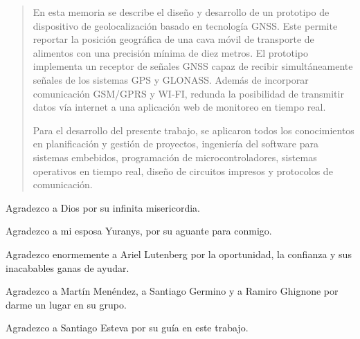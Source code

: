\documentclass[
11pt, %
spanish,
singlespacing, %
parskip, %
headsepline, %
]{MastersDoctoralThesis} %
\author{Ing. Luis David Díaz Charris} %
\begin{document}
\frontmatter %

\pagestyle{plain} %



\begin{abstract}
\addchaptertocentry{\abstractname} %
%
\centering

En esta memoria se describe el diseño y desarrollo de un prototipo de dispositivo de geolocalización basado en tecnología GNSS. Este permite reportar la posición geográfica de una cava móvil de transporte de alimentos con una precisión mínima de diez metros. El prototipo implementa un receptor de señales GNSS capaz de recibir simultáneamente señales de los sistemas GPS y GLONASS. Además de incorporar comunicación GSM/GPRS y WI-FI, redunda la posibilidad de transmitir datos vía internet a una aplicación web de monitoreo en tiempo real. 

Para el desarrollo del presente trabajo, se aplicaron todos los conocimientos en planificación y gestión de proyectos, ingeniería del software para sistemas embebidos, programación de microcontroladores, sistemas operativos en tiempo real, diseño de circuitos impresos y protocolos de comunicación. 

\end{abstract}


\begin{acknowledgements}
\vspace{1.5cm}

Agradezco a Dios por su infinita misericordia. 

Agradezco a mi esposa Yuranys, por su aguante para conmigo. 

Agradezco enormemente a Ariel Lutenberg por la oportunidad, la confianza y sus inacabables ganas de ayudar. 

Agradezco a Martín Menéndez, a Santiago Germino y a Ramiro Ghignone por darme un lugar en su grupo. 

Agradezco a Santiago Esteva por su guía en este trabajo. 

\end{acknowledgements}
\end{document}
